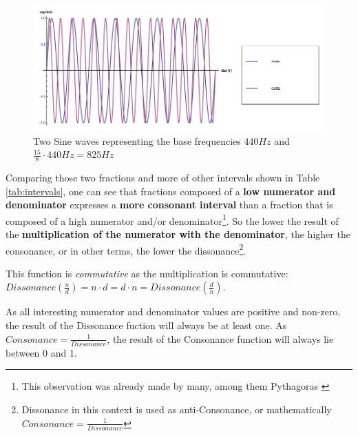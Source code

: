 \documentclass[12pt,a4paper,titlepage,oneside]{report}
\begin{document}
\begin{figure}[!ht]
\includegraphics[width=\textwidth]{images/sine_major_seventh.png}
\centering
\caption{Two Sine waves representing the base frequencies $440Hz$ and $\frac{15}{8} \cdot 440Hz = 825Hz$}
\label{fig:sine_major_seventh}
\end{figure}

Comparing those two fractions and more of other intervals shown in Table \ref{tab:intervals}, one can see that fractions composed of a \textbf{low numerator and denominator} expresses a \textbf{more consonant interval} than a fraction that is composed of a high numerator and/or denominator\footnote{This observation was already made by many, among them Pythagoras \cite{bib:cons_diss}}. So the lower the result of the \textbf{multiplication of the numerator with the denominator}, the higher the consonance, or in other terms, the lower the dissonance\footnote{Dissonance in this context is used as anti-Consonance, or mathematically $Consonance = \frac{1}{Dissonance}$}.

\noindent
{}

This function is \textit{commutative} as the multiplication is commutative: $Dissonance(\frac{n}{d}) = n \cdot d = d \cdot n = Dissonance(\frac{d}{n})$.

As all interesting numerator and denominator values are positive and non-zero, the result of the Dissonance fuction will always be at least one. As $Consonance = \frac{1}{Dissonance}$, the result of the Consonance function will always lie between 0 and 1.
\end{document}
